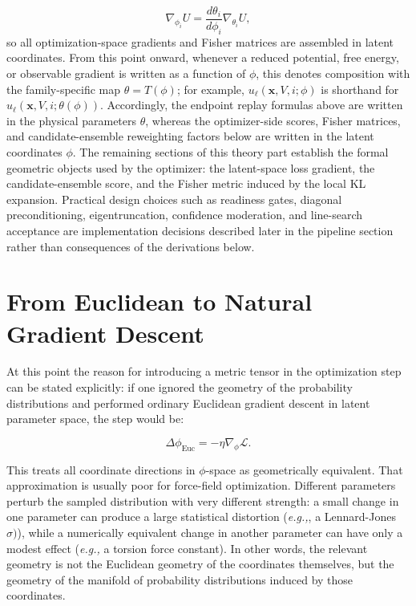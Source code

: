 \begin{equation}
    \nabla_{\phi_i} U
    =
    \frac{d \theta_i}{d \phi_i}
    \nabla_{\theta_i} U,
    \label{eq:chainphi}
\end{equation}
%
so all optimization-space gradients and Fisher matrices are assembled in latent coordinates. From this point onward, whenever a reduced potential, free energy, or observable gradient is written as a function of $\phi$, this denotes composition with the family-specific map $\theta = T(\phi)$; for example, $u_\ell(\mathbf{x}, V, i; \phi)$ is shorthand for $u_\ell(\mathbf{x}, V, i; \theta(\phi))$. Accordingly, the endpoint replay formulas above are written in the physical parameters $\theta$, whereas the optimizer-side scores, Fisher matrices, and candidate-ensemble reweighting factors below are written in the latent coordinates $\phi$. The remaining sections of this theory part establish the formal geometric objects used by the optimizer: the latent-space loss gradient, the candidate-ensemble score, and the Fisher metric induced by the local KL expansion. Practical design choices such as readiness gates, diagonal preconditioning, eigentruncation, confidence moderation, and line-search acceptance are implementation decisions described later in the pipeline section rather than consequences of the derivations below.

\section{From Euclidean to Natural Gradient Descent}


At this point the reason for introducing a metric tensor in the optimization step can be stated explicitly: if one ignored the geometry of the probability distributions and performed ordinary Euclidean gradient descent in latent parameter space, the step would be:

\begin{equation}
    \Delta \phi_{\mathrm{Euc}}
    =
    -
    \eta
    \nabla_\phi \mathcal{L}.
    \label{eq:eucstep}
\end{equation}

This treats all coordinate directions in $\phi$-space as geometrically equivalent. That approximation is usually poor for force-field optimization. Different parameters perturb the sampled distribution with very different strength: a small change in one parameter can produce a large statistical distortion (\textit{e.g.,}, a Lennard-Jones $\sigma)$), while a numerically equivalent change in another parameter can have only a modest effect (\textit{e.g.,} a torsion force constant). In other words, the relevant geometry is not the Euclidean geometry of the coordinates themselves, but the geometry of the manifold of probability distributions induced by those coordinates.

